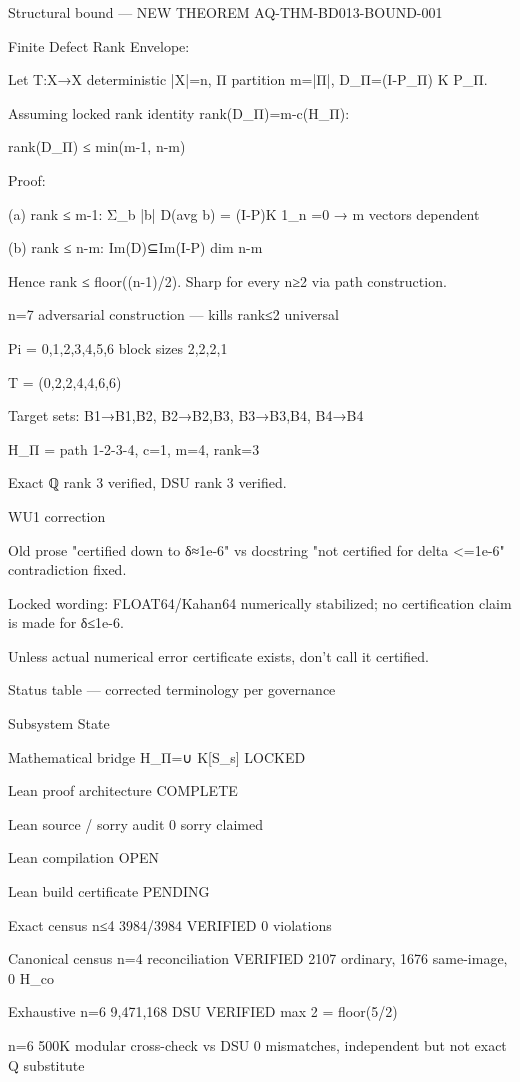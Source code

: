 Structural bound — NEW THEOREM AQ-THM-BD013-BOUND-001

Finite Defect Rank Envelope:

Let T:X→X deterministic |X|=n, Π partition m=|Π|, D_Π=(I-P_Π) K P_Π.

Assuming locked rank identity rank(D_Π)=m-c(H_Π):

rank(D_Π) ≤ min(m-1, n-m)

Proof:

(a) rank ≤ m-1: Σ_b |b| D(avg b) = (I-P)K 1_n =0 → m vectors dependent

(b) rank ≤ n-m: Im(D)⊆Im(I-P) dim n-m

Hence rank ≤ floor((n-1)/2). Sharp for every n≥2 via path construction.


n=7 adversarial construction — kills rank≤2 universal

Pi = {{0,1},{2,3},{4,5},{6}} block sizes 2,2,2,1

T = (0,2,2,4,4,6,6)

Target sets: B1→{B1,B2}, B2→{B2,B3}, B3→{B3,B4}, B4→{B4}

H_Π = path 1-2-3-4, c=1, m=4, rank=3

Exact ℚ rank 3 verified, DSU rank 3 verified.


WU1 correction

Old prose "certified down to δ≈1e-6" vs docstring "not certified for delta <=1e-6" contradiction fixed.

Locked wording: FLOAT64/Kahan64 numerically stabilized; no certification claim is made for δ≤1e-6.

Unless actual numerical error certificate exists, don't call it certified.


Status table — corrected terminology per governance

Subsystem	State

Mathematical bridge H_Π=∪ K[S_s]	LOCKED

Lean proof architecture	COMPLETE

Lean source / sorry audit	0 sorry claimed

Lean compilation	OPEN

Lean build certificate	PENDING

Exact census n≤4 3984/3984	VERIFIED 0 violations

Canonical census n=4 reconciliation	VERIFIED 2107 ordinary, 1676 same-image, 0 H_co

Exhaustive n=6 9,471,168 DSU	VERIFIED max 2 = floor(5/2)

n=6 500K modular cross-check vs DSU	0 mismatches, independent but not exact Q substitute

